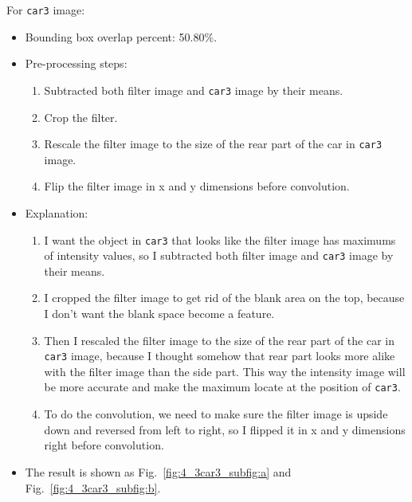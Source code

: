 \documentclass{assignment}
\begin{document}
\begin{problemlist}
For \texttt{car3} image:
\begin{itemize}
    \item Bounding box overlap percent: 50.80\%.
    \item Pre-processing steps: 
    \begin{enumerate}[label={\alph*)}]
        \item Subtracted both filter image and \texttt{car3} image by their means.
        \item Crop the filter.
        \item Rescale the filter image to the size of the rear part of the car in \texttt{car3} image.
        \item Flip the filter image in x and y dimensions before convolution.
    \end{enumerate}
    \item Explanation: 
    \begin{enumerate}[label={\alph*)}]
        \item I want the object in \texttt{car3} that looks like the filter image has maximums of intensity values, so I subtracted both filter image and \texttt{car3} image by their means.
        \item I cropped the filter image to get rid of the blank area on the top, because I don't want the blank space become a feature.
        \item Then I rescaled the filter image to the size of the rear part of the car in \texttt{car3} image, because I thought somehow that rear part looks more alike with the filter image than the side part. This way the intensity image will be more accurate and make the maximum locate at the position of \texttt{car3}.
        \item To do the convolution, we need to make sure the filter image is upside down and reversed from left to right, so I flipped it in x and y dimensions right before convolution.
    \end{enumerate}
    \item The result is shown as Fig.~\ref{fig:4_3car3_subfig:a} and Fig.~\ref{fig:4_3car3_subfig:b}.
\end{itemize}


\end{problemlist}
\end{document}
